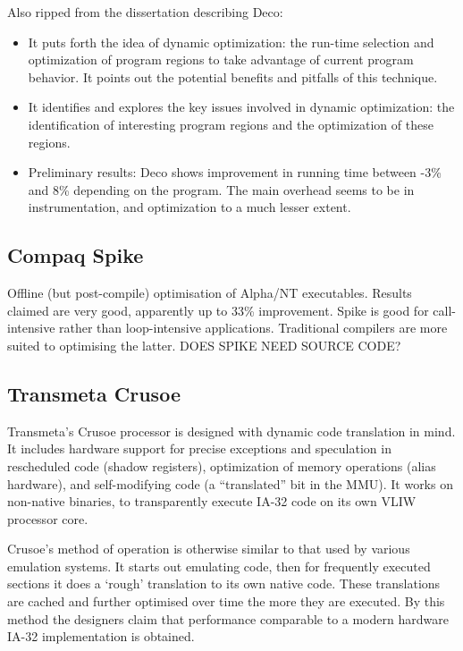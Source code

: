 Also ripped from the dissertation describing Deco: 

\begin{itemize}
\item It puts forth the idea of dynamic optimization: the run-time selection and optimization of program regions to take advantage of current program behavior. It points out the potential benefits and pitfalls of this technique.
\item It identifies and explores the key issues involved in dynamic optimization: the identification of interesting program regions and the optimization of these regions.
\item Preliminary results: Deco shows improvement in running time between -3\% and 8\% depending on the program. The main overhead seems to be in instrumentation, and optimization to a much lesser extent. 
\end{itemize}

\subsection{Compaq Spike}

Offline (but post-compile) optimisation of Alpha/NT executables. Results claimed are very good, apparently up to 33\% improvement. Spike is good for call-intensive rather than loop-intensive applications. Traditional compilers are more suited to optimising the latter. DOES SPIKE NEED SOURCE CODE?

\subsection{Transmeta Crusoe}

Transmeta's Crusoe processor is designed with dynamic code translation in mind. It includes hardware support for precise exceptions and speculation in rescheduled code (shadow registers), optimization of memory operations (alias hardware), and self-modifying code (a ``translated'' bit in the MMU). It works on non-native binaries, to transparently execute IA-32 code on its own VLIW processor core.

Crusoe's method of operation is otherwise similar to that used by various emulation systems. It starts out emulating code, then for frequently executed sections it does a `rough' translation to its own native code. These translations are cached and further optimised over time the more they are executed. By this method the designers claim that performance comparable to a modern hardware IA-32 implementation is obtained.

